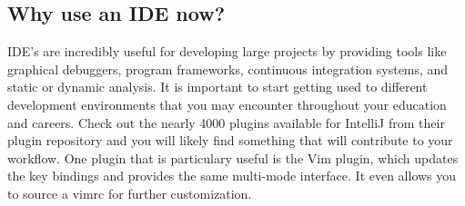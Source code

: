 \documentclass[../../main.tex]{subfiles}
\begin{document}
\subsection{Why use an IDE now?}
IDE's are incredibly useful for developing large projects by providing tools like graphical
debuggers, program frameworks, continuous integration systems, and static or dynamic analysis. It
is important to start getting used to different development environments that you may encounter
throughout your education and careers. Check out the nearly 4000 plugins available for IntelliJ
from their plugin repository and you will likely find something that will contribute to your
workflow. One plugin that is particulary useful is the Vim plugin, which updates the key bindings
and provides the same multi-mode interface. It even allows you to source a vimrc for further
customization.
\end{document}
